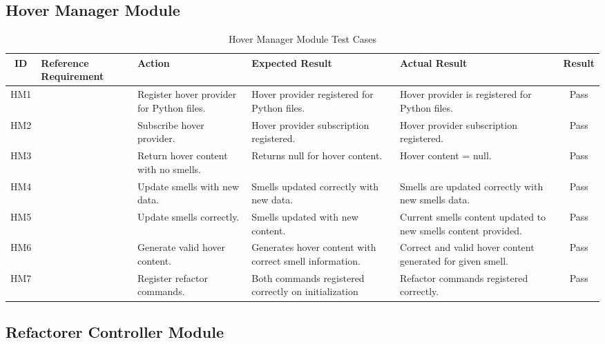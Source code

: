 \documentclass[12pt, titlepage]{article}
\begin{document}
\subsection{Hover Manager Module}
\begin{table}[h!]
\centering
\begin{tabular}{|c|p{2.5cm}|p{3cm}|p{3.5cm}|p{3.5cm}|c|}
\hline
\textbf{ID} & \textbf{Reference Requirement} & \textbf{Action} & \textbf{Expected Result} & \textbf{Actual Result} & \textbf{Result} \\ \hline

HM1 & & Register hover provider for Python files. & Hover provider registered for Python files. & Hover provider is registered for Python files. & \cellcolor{green!20} Pass \\ \hline

HM2 & & Subscribe hover provider. & Hover provider subscription registered. & Hover provider subscription registered. & \cellcolor{green!20} Pass \\ \hline

HM3 & & Return hover content with no smells. & Returns null for hover content. & Hover content = null. & \cellcolor{green!20} Pass \\ \hline

HM4 & & Update smells with new data. & Smells updated correctly with new data. & Smells are updated correctly with new smells data. & \cellcolor{green!20} Pass \\ \hline

HM5 & & Update smells correctly. & Smells updated with new content. & Current smells content updated to new smells content provided.  & \cellcolor{green!20} Pass \\ \hline

HM6 & & Generate valid hover content. & Generates hover content with correct smell information. & Correct and valid hover content generated for given smell. & \cellcolor{green!20} Pass \\ \hline

HM7 & & Register refactor commands. & Both commands registered correctly on initialization & Refactor commands registered correctly. & \cellcolor{green!20} Pass \\ \hline

\end{tabular}
\caption{Hover Manager Module Test Cases}
\label{table:hover_manager_tests}
\end{table}


\subsection{Refactorer Controller Module}
\end{document}
